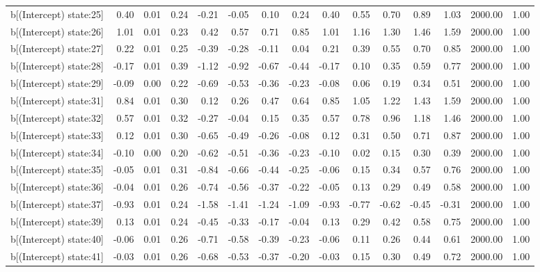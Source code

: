 \begin{table}[ht]
\begin{tabular}{rrrrrrrrrrrrrrr}
  b[(Intercept) state:25] & 0.40 & 0.01 & 0.24 & -0.21 & -0.05 & 0.10 & 0.24 & 0.40 & 0.55 & 0.70 & 0.89 & 1.03 & 2000.00 & 1.00 \\ 
  b[(Intercept) state:26] & 1.01 & 0.01 & 0.23 & 0.42 & 0.57 & 0.71 & 0.85 & 1.01 & 1.16 & 1.30 & 1.46 & 1.59 & 2000.00 & 1.00 \\ 
  b[(Intercept) state:27] & 0.22 & 0.01 & 0.25 & -0.39 & -0.28 & -0.11 & 0.04 & 0.21 & 0.39 & 0.55 & 0.70 & 0.85 & 2000.00 & 1.00 \\ 
  b[(Intercept) state:28] & -0.17 & 0.01 & 0.39 & -1.12 & -0.92 & -0.67 & -0.44 & -0.17 & 0.10 & 0.35 & 0.59 & 0.77 & 2000.00 & 1.00 \\ 
  b[(Intercept) state:29] & -0.09 & 0.00 & 0.22 & -0.69 & -0.53 & -0.36 & -0.23 & -0.08 & 0.06 & 0.19 & 0.34 & 0.51 & 2000.00 & 1.00 \\ 
  b[(Intercept) state:31] & 0.84 & 0.01 & 0.30 & 0.12 & 0.26 & 0.47 & 0.64 & 0.85 & 1.05 & 1.22 & 1.43 & 1.59 & 2000.00 & 1.00 \\ 
  b[(Intercept) state:32] & 0.57 & 0.01 & 0.32 & -0.27 & -0.04 & 0.15 & 0.35 & 0.57 & 0.78 & 0.96 & 1.18 & 1.46 & 2000.00 & 1.00 \\ 
  b[(Intercept) state:33] & 0.12 & 0.01 & 0.30 & -0.65 & -0.49 & -0.26 & -0.08 & 0.12 & 0.31 & 0.50 & 0.71 & 0.87 & 2000.00 & 1.00 \\ 
  b[(Intercept) state:34] & -0.10 & 0.00 & 0.20 & -0.62 & -0.51 & -0.36 & -0.23 & -0.10 & 0.02 & 0.15 & 0.30 & 0.39 & 2000.00 & 1.00 \\ 
  b[(Intercept) state:35] & -0.05 & 0.01 & 0.31 & -0.84 & -0.66 & -0.44 & -0.25 & -0.06 & 0.15 & 0.34 & 0.57 & 0.76 & 2000.00 & 1.00 \\ 
  b[(Intercept) state:36] & -0.04 & 0.01 & 0.26 & -0.74 & -0.56 & -0.37 & -0.22 & -0.05 & 0.13 & 0.29 & 0.49 & 0.58 & 2000.00 & 1.00 \\ 
  b[(Intercept) state:37] & -0.93 & 0.01 & 0.24 & -1.58 & -1.41 & -1.24 & -1.09 & -0.93 & -0.77 & -0.62 & -0.45 & -0.31 & 2000.00 & 1.00 \\ 
  b[(Intercept) state:39] & 0.13 & 0.01 & 0.24 & -0.45 & -0.33 & -0.17 & -0.04 & 0.13 & 0.29 & 0.42 & 0.58 & 0.75 & 2000.00 & 1.00 \\ 
  b[(Intercept) state:40] & -0.06 & 0.01 & 0.26 & -0.71 & -0.58 & -0.39 & -0.23 & -0.06 & 0.11 & 0.26 & 0.44 & 0.61 & 2000.00 & 1.00 \\ 
  b[(Intercept) state:41] & -0.03 & 0.01 & 0.26 & -0.68 & -0.53 & -0.37 & -0.20 & -0.03 & 0.15 & 0.30 & 0.49 & 0.72 & 2000.00 & 1.00 \\ 

\end{tabular}
\end{table}
